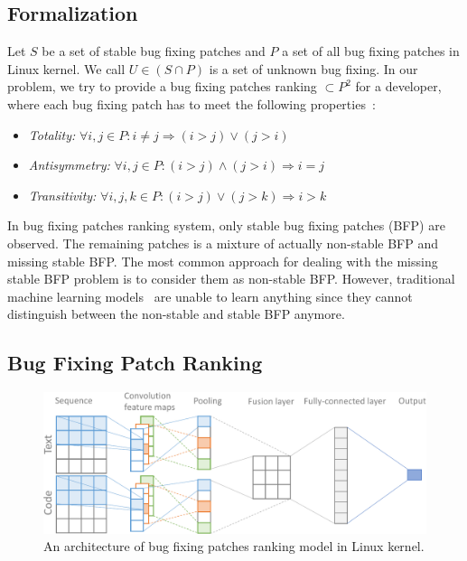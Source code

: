 \subsection{Formalization}
\label{sec:formalization}

Let $S$ be a set of stable bug fixing patches and $P$ a set of all bug fixing patches in Linux kernel. We call $U \in (S \cap P ) $ is a set of unknown bug fixing. In our problem, we try to provide a bug fixing patches ranking $\subset P^2$ for a developer, where each bug fixing patch has to meet the following properties~\cite{rendle2009bpr}:
\begin{itemize}
	\item \textit{Totality:} $\forall i,j \in P: i \neq j \Rightarrow (i > j) \vee (j > i)$
	\item \textit{Antisymmetry:} $\forall i,j \in P: (i > j) \wedge (j > i) \Rightarrow i = j$ 
	\item \textit{Transitivity:} $\forall i,j,k \in P: (i > j) \vee (j > k) \Rightarrow i > k$ 
\end{itemize}

In bug fixing patches ranking system, only stable bug fixing patches (BFP) are observed. The remaining patches is a mixture of actually non-stable BFP and missing stable BFP. The most common approach for dealing with the missing stable BFP problem is to consider them as non-stable BFP. However, traditional machine learning models~\cite{bishop2006pattern} are unable to learn anything since they cannot distinguish between the non-stable and stable BFP anymore. 

\subsection{Bug Fixing Patch Ranking}
\label{sec:bugranking}
\begin{figure}[t!]
	\centering
	\includegraphics[width=1.0\textwidth]{BugPatchingRanking_v4-cropped.pdf}
	\caption{An architecture of bug fixing patches ranking model in Linux kernel.}
	\label{fig:bugranking}
\end{figure}

